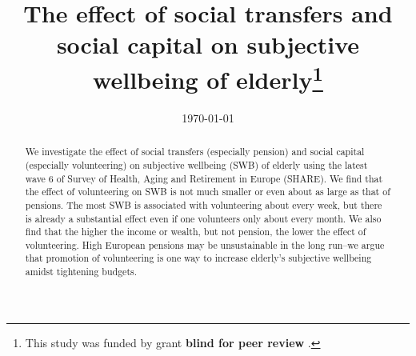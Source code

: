 \documentclass[10pt, letterpaper]{article}
\date{{}\today}
\title{  
The effect of social transfers and social capital on subjective wellbeing of
elderly\footnote{This study was funded by grant \textbf{blind for peer review}  %
  .}
}
\author{
}
\begin{document}

%
\maketitle
\vspace{-.4in}
\begin{center}

\end{center}


\begin{abstract}
\noindent We investigate the effect of social transfers (especially pension) and
social capital (especially volunteering) on subjective wellbeing (SWB) of
elderly using the latest wave 6 of Survey of Health, Aging and Retirement in Europe
(SHARE). We find that the effect of volunteering on SWB is not much smaller or
even about as large as that of pensions. The most SWB is associated with volunteering about
every week, but there is already a substantial effect even if one volunteers only
about every month. 
We also find that the higher the income or wealth, but not pension, the lower
the effect of volunteering.  
High European pensions may be unsustainable in the long run--we argue that
 promotion of volunteering is one way to increase elderly's subjective wellbeing amidst tightening budgets.
\end{abstract}
\vspace{.15in} 
\vspace{.25in} 
\end{document}
